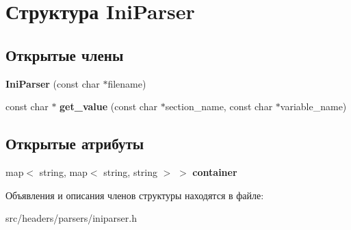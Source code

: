 \hypertarget{struct_ini_parser}{}\section{Структура Ini\+Parser}
\label{struct_ini_parser}
\subsection*{Открытые члены}
\begin{DoxyCompactItemize}
\item 
\mbox{\label{struct_ini_parser_a3121a8ebef278faacb449232213f9e7b}} 
{\bfseries Ini\+Parser} (const char $\ast$filename)
\item 
\mbox{\label{struct_ini_parser_a117753091e800e192a9d07c0dff7ec33}} 
const char $\ast$ {\bfseries get\+\_\+value} (const char $\ast$section\+\_\+name, const char $\ast$variable\+\_\+name)
\end{DoxyCompactItemize}
\subsection*{Открытые атрибуты}
\begin{DoxyCompactItemize}
\item 
\mbox{\label{struct_ini_parser_a6262a2d16e650132badc2661dfc55710}} 
map$<$ string, map$<$ string, string $>$ $>$ {\bfseries container}
\end{DoxyCompactItemize}


Объявления и описания членов структуры находятся в файле\+:\begin{DoxyCompactItemize}
\item 
src/headers/parsers/iniparser.\+h\end{DoxyCompactItemize}
